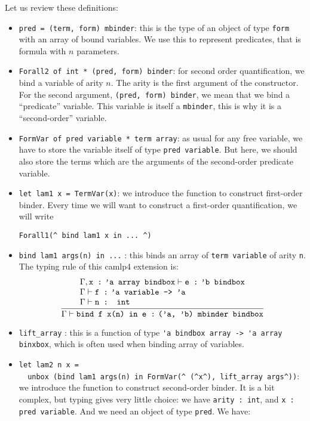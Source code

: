 \documentclass[11pt]{article}
\begin{document}
Let us review these definitions:
\begin{itemize}
\item \verb#pred = (term, form) mbinder#: this is the type of an object
of type \verb#form# with an array of bound variables. We use this to
represent predicates, that is formula with $n$ parameters.

\item \verb#Forall2 of int * (pred, form) binder#: for second order
quantification, we bind a variable of arity $n$. The arity is the
first argument of the constructor. For the second argument,
\verb#(pred, form) binder#, we mean that we bind a ``predicate''
variable. This variable is
itself a \verb#mbinder#, this is why it is a ``second-order'' variable.

\item \verb#FormVar of pred variable * term array#: as usual
for any free variable, we have to store
the variable itself of type \verb#pred variable#.
But here, we should also store the terms which
are the arguments of the second-order predicate variable.

\item \verb#let lam1 x = TermVar(x)#: we introduce the
function to construct first-order binder. Every time we will want to
construct a first-order quantification, we will write

\verb#Forall1(^ bind lam1 x in ... ^)#

\item \verb#bind lam1 args(n) in ...# : this binds an array of
  \verb#term variable# of arity \verb#n#. The typing rule of this camlp4
extension is:
$$
\frac{
\begin{array}{l}\Gamma, \hbox{\tt x :$\!$ 'a array bindbox} \vdash \hbox{\tt e
:$\!$ 'b bindbox}
\cr \Gamma \vdash \hbox{\tt f :$\!$ 'a variable
-> 'a}
\cr \Gamma \vdash \hbox{\tt n : int}
\end{array}}
{\Gamma \vdash \hbox{\tt bind f x(n) in e :$\!$ ('a, 'b) mbinder bindbox}}
$$

\item \verb#lift_array# : this is a function of type
  \verb#'a bindbox array -> 'a array binxbox#, which is often used when
  binding array of variables.

\item \verb#let lam2 n x =#\\
\verb#  unbox (bind lam1 args(n) in FormVar(^ (^x^), lift_array args^))#:
we introduce the
function to construct second-order binder. It is a bit complex, but
typing gives very little choice: we have \verb#arity : int#,
and \verb#x : pred variable#. And we need an
object of type \verb#pred#. We have:


\end{itemize}
\end{document}
